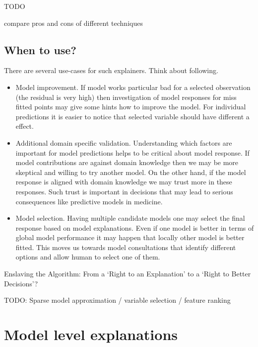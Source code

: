 \documentclass[]{krantz}
\providecommand{\tightlist}{%
  \setlength{\itemsep}{0pt}\setlength{\parskip}{0pt}}
\theoremstyle{definition}
\theoremstyle{definition}
\theoremstyle{definition}
\theoremstyle{remark}
\begin{document}
TODO

compare pros and cons of different techniques

\hypertarget{when-to-use}{%
\subsection{When to use?}\label{when-to-use}}

There are several use-cases for such explainers. Think about following.

\begin{itemize}
\tightlist
\item
  Model improvement. If model works particular bad for a selected
  observation (the residual is very high) then investigation of model
  responses for miss fitted points may give some hints how to improve
  the model. For individual predictions it is easier to notice that
  selected variable should have different a effect.
\item
  Additional domain specific validation. Understanding which factors are
  important for model predictions helps to be critical about model
  response. If model contributions are against domain knowledge then we
  may be more skeptical and willing to try another model. On the other
  hand, if the model response is aligned with domain knowledge we may
  trust more in these responses. Such trust is important in decisions
  that may lead to serious consequences like predictive models in
  medicine.
\item
  Model selection. Having multiple candidate models one may select the
  final response based on model explanations. Even if one model is
  better in terms of global model performance it may happen that locally
  other model is better fitted. This moves us towards model
  consultations that identify different options and allow human to
  select one of them.
\end{itemize}

Enslaving the Algorithm: From a `Right to an Explanation' to a `Right to
Better Decisions'? \citep{Edwards_Veale_2018}

TODO: Sparse model approximation / variable selection / feature ranking

\hypertarget{model-level-explanations}{%
\section*{Model level explanations}\label{model-level-explanations}}
\end{document}
